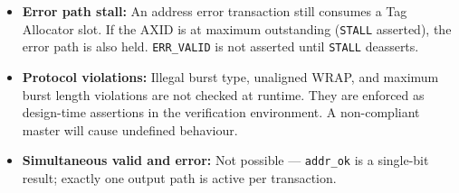 \begin{itemize}
  \item \textbf{Error path stall:} An address error transaction still
        consumes a Tag Allocator slot. If the AXID is at maximum
        outstanding (\texttt{STALL} asserted), the error path is also
        held. \texttt{ERR\_VALID} is not asserted until \texttt{STALL}
        deasserts.
  \item \textbf{Protocol violations:} Illegal burst type, unaligned
        WRAP, and maximum burst length violations are not checked at
        runtime. They are enforced as design-time assertions in the
        verification environment. A non-compliant master will cause
        undefined behaviour.
  \item \textbf{Simultaneous valid and error:} Not possible —
        \texttt{addr\_ok} is a single-bit result; exactly one output
        path is active per transaction.
\end{itemize}